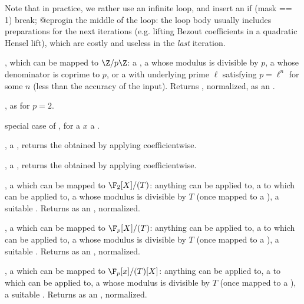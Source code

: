 Note that in practice, we rather use an infinite loop, and insert an
\bprog
  if (mask == 1) break;
@eprog\noindent in the middle of the loop: the loop body usually includes
preparations for the next iterations (e.g. lifting Bezout coefficients
in a quadratic Hensel lift), which are costly and useless in the \emph{last}
iteration.



,  which can be mapped to
$\Z/p\Z$: a , a  whose modulus is divisible by $p$,
a  whose denominator is coprime to $p$, or a  with
underlying prime $\ell$ satisfying $p = \ell^n$ for some $n$ (less than the
accuracy of the input). Returns , normalized, as an
.

, as  for $p = 2$.

 special case of ,
for a $x$ a .

,  a , returns the
 obtained by applying  coefficientwise.

,  a , returns the
 obtained by applying  coefficientwise.

,  a  which can be
mapped to $\F_2[X]/(T)$: anything  can be applied to,
a  to which  can be applied to, a 
whose modulus is divisible by $T$ (once mapped to a ), a suitable
. Returns  as an , normalized.

,  a  which can be
mapped to $\F_p[X]/(T)$: anything  can be applied to,
a  to which  can be applied to, a 
whose modulus is divisible by $T$ (once mapped to a ), a suitable
. Returns  as an , normalized.

,  a  which can be
mapped to $\F_p[x]/(T)[X]$: anything  can be applied to,
a  to which  can be applied to, a 
whose modulus is divisible by $T$ (once mapped to a ), a suitable
. Returns  as an , normalized.

